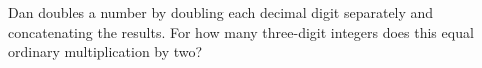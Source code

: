 Dan doubles a number by doubling each decimal digit separately and concatenating the results. For how many three-digit integers does this equal ordinary multiplication by two?
